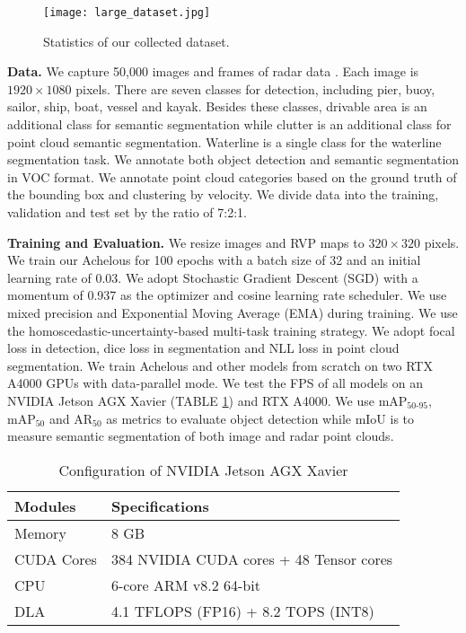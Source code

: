 \documentclass[letterpaper, 10 pt, conference]{ieeeconf}
\begin{document}
 \begin{figure}
    \centering
    \texttt{[image: large\_dataset.jpg]}
    \caption{Statistics of our collected dataset.}
    \label{fig:dataset_statistics}
\end{figure}

 \textbf{Data.} We capture 50,000 images and frames of radar data \cite{yao2023waterscenes}. Each image is $1920 \times 1080$ pixels. There are seven classes for detection, including pier, buoy, sailor, ship, boat, vessel and kayak. Besides these classes, drivable area is an additional class for semantic segmentation while clutter is an additional class for point cloud semantic segmentation. Waterline is a single class for the waterline segmentation task. We annotate both object detection and semantic segmentation in VOC format. We annotate point cloud categories based on the ground truth of the bounding box and clustering by velocity. We divide data into the training, validation and test set by the ratio of 7:2:1.

\textbf{Training and Evaluation.} We resize images and RVP maps to $320 \times 320$ pixels. We train our Achelous for 100 epochs with a batch size of 32 and an initial learning rate of 0.03. We adopt Stochastic Gradient Descent (SGD) with a momentum of 0.937 as the optimizer and cosine learning rate scheduler. We use mixed precision and Exponential Moving Average (EMA) during training. We use the homoscedastic-uncertainty-based \cite{kendall2018multi} multi-task training strategy. We adopt focal loss in detection, dice loss in segmentation and NLL loss in point cloud segmentation. We train Achelous and other models from scratch on two RTX A4000 GPUs with data-parallel mode. We test the FPS of all models on an NVIDIA Jetson AGX Xavier (TABLE \ref{tab:jetson}) and RTX A4000. We use mAP$_{\text{50-95}}$, mAP$_{50}$ and AR$_{50}$ as metrics to evaluate object detection while mIoU is to measure semantic segmentation of both image and radar point clouds.

\begin{table}
\setlength\tabcolsep{3.5pt}
\caption{Configuration of NVIDIA Jetson AGX Xavier}
\centering
\label{tab:jetson}
\begin{tabular}{l|l}  
\toprule   
  Modules & Specifications \\
\midrule 
  Memory & 8 GB \\
  CUDA Cores & 384 NVIDIA CUDA cores + 48 Tensor cores \\
  CPU & 6-core ARM v8.2 64-bit \\
  DLA & 4.1 TFLOPS (FP16) + 8.2 TOPS (INT8)\\


\bottomrule  
\end{tabular}
\end{table}
\end{document}
